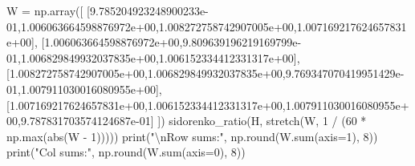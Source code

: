 \documentclass[
  letterpaper,
  DIV=11,
  numbers=noendperiod]{scrartcl}
\newenvironment{Shaded}{\begin{snugshade}}{\end{snugshade}}
\newcommand{\BuiltInTok}[1]{\textcolor[rgb]{0.00,0.23,0.31}{#1}}
\newcommand{\CharTok}[1]{\textcolor[rgb]{0.13,0.47,0.30}{#1}}
\newcommand{\DecValTok}[1]{\textcolor[rgb]{0.68,0.00,0.00}{#1}}
\newcommand{\FloatTok}[1]{\textcolor[rgb]{0.68,0.00,0.00}{#1}}
\newcommand{\NormalTok}[1]{\textcolor[rgb]{0.00,0.23,0.31}{#1}}
\newcommand{\OperatorTok}[1]{\textcolor[rgb]{0.37,0.37,0.37}{#1}}
\newcommand{\StringTok}[1]{\textcolor[rgb]{0.13,0.47,0.30}{#1}}
\begin{document}
\begin{Shaded}
\begin{Highlighting}[]
\NormalTok{W }\OperatorTok{=}\NormalTok{ np.array([}
\NormalTok{  [}\FloatTok{9.785204923248900233e{-}01}\NormalTok{,}\FloatTok{1.006063664598876972e+00}\NormalTok{,}\FloatTok{1.008272758742907005e+00}\NormalTok{,}\FloatTok{1.007169217624657831e+00}\NormalTok{],}
\NormalTok{[}\FloatTok{1.006063664598876972e+00}\NormalTok{,}\FloatTok{9.809639196219169799e{-}01}\NormalTok{,}\FloatTok{1.006829849932037835e+00}\NormalTok{,}\FloatTok{1.006152334412331317e+00}\NormalTok{],}
\NormalTok{[}\FloatTok{1.008272758742907005e+00}\NormalTok{,}\FloatTok{1.006829849932037835e+00}\NormalTok{,}\FloatTok{9.769347070419951429e{-}01}\NormalTok{,}\FloatTok{1.007911030016080955e+00}\NormalTok{],}
\NormalTok{[}\FloatTok{1.007169217624657831e+00}\NormalTok{,}\FloatTok{1.006152334412331317e+00}\NormalTok{,}\FloatTok{1.007911030016080955e+00}\NormalTok{,}\FloatTok{9.787831703574124687e{-}01}\NormalTok{]}
\NormalTok{])}
\NormalTok{sidorenko\_ratio(H, stretch(W, }\DecValTok{1} \OperatorTok{/}\NormalTok{ (}\DecValTok{60} \OperatorTok{*}\NormalTok{ np.}\BuiltInTok{max}\NormalTok{(}\BuiltInTok{abs}\NormalTok{(W }\OperatorTok{{-}} \DecValTok{1}\NormalTok{)))))}
\BuiltInTok{print}\NormalTok{(}\StringTok{"}\CharTok{\textbackslash{}n}\StringTok{Row sums:"}\NormalTok{, np.}\BuiltInTok{round}\NormalTok{(W.}\BuiltInTok{sum}\NormalTok{(axis}\OperatorTok{=}\DecValTok{1}\NormalTok{), }\DecValTok{8}\NormalTok{))}
\BuiltInTok{print}\NormalTok{(}\StringTok{"Col sums:"}\NormalTok{, np.}\BuiltInTok{round}\NormalTok{(W.}\BuiltInTok{sum}\NormalTok{(axis}\OperatorTok{=}\DecValTok{0}\NormalTok{), }\DecValTok{8}\NormalTok{))}


\end{Highlighting}
\end{Shaded}
\end{document}
